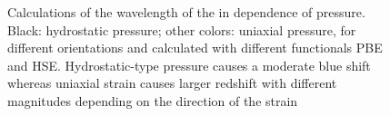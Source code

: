 	\begin{figure}[tp]
		\centering
		\caption{Calculations of the wavelength of the \siv \ZPL in dependence of pressure. Black: hydrostatic pressure; other colors: uniaxial pressure, for different orientations and calculated with different functionals PBE and HSE. Hydrostatic-type pressure causes a moderate blue shift whereas uniaxial strain causes larger redshift with different magnitudes depending on the direction of the strain }
		\label{fig::stress_pressure}
	\end{figure}


